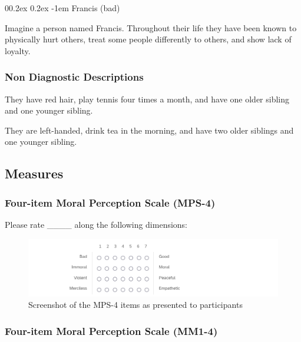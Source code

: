 \documentclass[
  american,
  man,floatsintext]{apa7}
\makeatletter
\let\oldparagraph\paragraph
\renewcommand{\paragraph}[1]{\oldparagraph{#1}\mbox{}}
\renewcommand{\paragraph}{\@startsection{paragraph}{4}{\parindent}%
  {0\baselineskip \@plus 0.2ex \@minus 0.2ex}%
  {-1em}%
  {\normalfont\normalsize\bfseries\itshape\typesectitle}}
\makeatother
\begin{document}
\hypertarget{francis-bad}{%
\paragraph{Francis (bad)}\label{francis-bad}}

Imagine a person named Francis.
Throughout their life they have been known to physically hurt others, treat some people differently to others, and show lack of loyalty.

\hypertarget{non-diagnostic-descriptions-1}{%
\subsubsection{Non Diagnostic Descriptions}\label{non-diagnostic-descriptions-1}}

They have red hair, play tennis four times a month, and have one older sibling and one younger sibling.

They are left-handed, drink tea in the morning, and have two older siblings and one younger sibling.

\hypertarget{measures}{%
\subsection{Measures}\label{measures}}

\hypertarget{four-item-moral-perception-scale-mps-4}{%
\subsubsection{Four-item Moral Perception Scale (MPS-4)}\label{four-item-moral-perception-scale-mps-4}}

Please rate \_\_\_\_ along the following dimensions:

\begin{figure}
\centering
\includegraphics{../resources/images/mps4.png}
\caption{Screenshot of the MPS-4 items as presented to participants}
\end{figure}

\hypertarget{four-item-moral-perception-scale-mm1-4}{%
\subsubsection{Four-item Moral Perception Scale (MM1-4)}\label{four-item-moral-perception-scale-mm1-4}}
\end{document}
